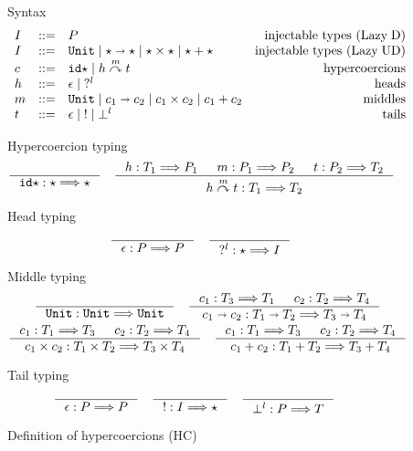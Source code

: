 \documentclass[acmsmall,review,anonymous]{acmart}\settopmatter{printfolios=true,printccs=false,printacmref=false}
\newcommand{\stxrule}[3]{#1 & ::= & #3 & \text{#2}\\}
\newcommand{\plus}[0]{+}
\newcommand{\lazyUD}{Lazy\;UD}
\newcommand{\lazyD}{Lazy\;D}
\newcommand{\TOOdyn}[0]{\star}
\newcommand{\POOunit}[0]{\mathtt{Unit}}
\newcommand{\POOfun}[2]{#1 \shortrightarrow #2}
\newcommand{\POOprod}[2]{#1 \times #2}
\newcommand{\POOsum}[2]{#1 \plus #2}
\newcommand{\typingHC}[3]{#1 : #2 \Longrightarrow #3}
\newcommand{\hyperCoercionI}[0]{\mathtt{id\star}}
\newcommand{\hyperCoercionC}[3]{#1 \overset{#2}{\curvearrowright} #3}
\begin{document}
\begin{figure}
  Syntax
  \[
  \begin{array}{lclr}
  \stxrule{I}{injectable types (\lazyD)}{P}
  \stxrule{I}{injectable types (\lazyUD)}{
    \POOunit \mid
    \POOfun{\TOOdyn}{\TOOdyn} \mid
    \POOprod{\TOOdyn}{\TOOdyn} \mid
    \POOsum{\TOOdyn}{\TOOdyn}
  }
  \stxrule{c}{hypercoercions}{
    \hyperCoercionI \mid{}
    \hyperCoercionC{h}{m}{t}
  }
  \stxrule{h}{heads}{
    \epsilon \mid{}
    ?^l
  }
  \stxrule{m}{middles}{
    \POOunit \mid
    \POOfun{c_1}{c_2} \mid
    \POOprod{c_1}{c_2} \mid
    \POOsum{c_1}{c_2}
  }
  \stxrule{t}{tails}{
    \epsilon \mid{}
    ! \mid{}
    \bot^l
  }
  \end{array}
  \]
    
  Hypercoercion typing 
  \begin{gather*}
  \inference{}{\typingHC{\hyperCoercionI}{\TOOdyn}{\TOOdyn}}
  \quad
  \inference{
    \typingHC{h}{T_1}{P_1} &
    \typingHC{m}{P_1}{P_2} &
    \typingHC{t}{P_2}{T_2}
  }{
    \typingHC{\hyperCoercionC{h}{m}{t}}{T_1}{T_2}
  }
  \end{gather*}
  
  Head typing \fbox{$\typingHC{h}{T}{P}$}
  \begin{gather*}
  \inference{}{\typingHC{\epsilon}{P}{P}}
  \quad
  \inference{}{\typingHC{?^l}{\TOOdyn}{I}}
  \end{gather*}
  
  Middle typing \fbox{$\typingHC{m}{T}{T}$}
  \begin{gather*}
  \inference{}{\typingHC{\POOunit}{\POOunit}{\POOunit}}
  \quad
  \inference{
    \typingHC{c_1}{T_3}{T_1} &
    \typingHC{c_2}{T_2}{T_4}
  }{
    \typingHC{\POOfun{c_1}{c_2}}{\POOfun{T_1}{T_2}}{\POOfun{T_3}{T_4}}
  }
  \\
  \inference{
    \typingHC{c_1}{T_1}{T_3} &
    \typingHC{c_2}{T_2}{T_4}
  }{
    \typingHC{\POOprod{c_1}{c_2}}{\POOprod{T_1}{T_2}}{\POOprod{T_3}{T_4}}
  }
  \quad
  \inference{
    \typingHC{c_1}{T_1}{T_3} &
    \typingHC{c_2}{T_2}{T_4}
  }{
    \typingHC{\POOsum{c_1}{c_2}}{\POOsum{T_1}{T_2}}{\POOsum{T_3}{T_4}}
  }
    \end{gather*}
    
    Tail typing \fbox{$\typingHC{t}{P}{T}$}
    \begin{gather*}
    \inference{}{\typingHC{\epsilon}{P}{P}} \quad
    \inference{}{\typingHC{!}{I}{\TOOdyn}} \quad
    \inference{}{\typingHC{\bot^l}{P}{T}} \quad
    \end{gather*}
  
  \caption{Definition of hypercoercions (HC)}
  \label{fig:hypercoercion}
\end{figure}
\end{document}
